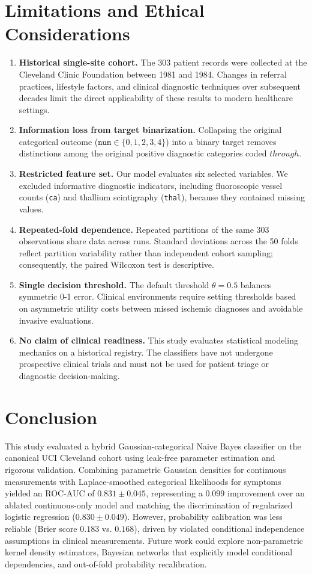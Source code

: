 \documentclass[conference]{IEEEtran}
\begin{document}
\section{Limitations and Ethical Considerations}
\begin{enumerate}
\item \textbf{Historical single-site cohort.} The 303 patient records were collected at the Cleveland Clinic Foundation between 1981 and 1984. Changes in referral practices, lifestyle factors, and clinical diagnostic techniques over subsequent decades limit the direct applicability of these results to modern healthcare settings.
\item \textbf{Information loss from target binarization.} Collapsing the original categorical outcome ($\texttt{num}\in\{0,1,2,3,4\}$) into a binary target removes distinctions among the original positive diagnostic categories coded $ through $.
\item \textbf{Restricted feature set.} Our model evaluates six selected variables. We excluded informative diagnostic indicators, including fluoroscopic vessel counts (\texttt{ca}) and thallium scintigraphy (\texttt{thal}), because they contained missing values.
\item \textbf{Repeated-fold dependence.} Repeated partitions of the same 303 observations share data across runs. Standard deviations across the 50 folds reflect partition variability rather than independent cohort sampling; consequently, the paired Wilcoxon test is descriptive.
\item \textbf{Single decision threshold.} The default threshold $\theta=0.5$ balances symmetric 0-1 error. Clinical environments require setting thresholds based on asymmetric utility costs between missed ischemic diagnoses and avoidable invasive evaluations.
\item \textbf{No claim of clinical readiness.} This study evaluates statistical modeling mechanics on a historical registry. The classifiers have not undergone prospective clinical trials and must not be used for patient triage or diagnostic decision-making.
\end{enumerate}

\section{Conclusion}
This study evaluated a hybrid Gaussian-categorical Naive Bayes classifier on the canonical UCI Cleveland cohort using leak-free parameter estimation and rigorous validation. Combining parametric Gaussian densities for continuous measurements with Laplace-smoothed categorical likelihoods for symptoms yielded an ROC-AUC of $0.831\pm0.045$, representing a $0.099$ improvement over an ablated continuous-only model and matching the discrimination of regularized logistic regression ($0.830\pm0.049$). However, probability calibration was less reliable (Brier score $0.183$ vs. $0.168$), driven by violated conditional independence assumptions in clinical measurements. Future work could explore non-parametric kernel density estimators, Bayesian networks that explicitly model conditional dependencies, and out-of-fold probability recalibration.
\end{document}
